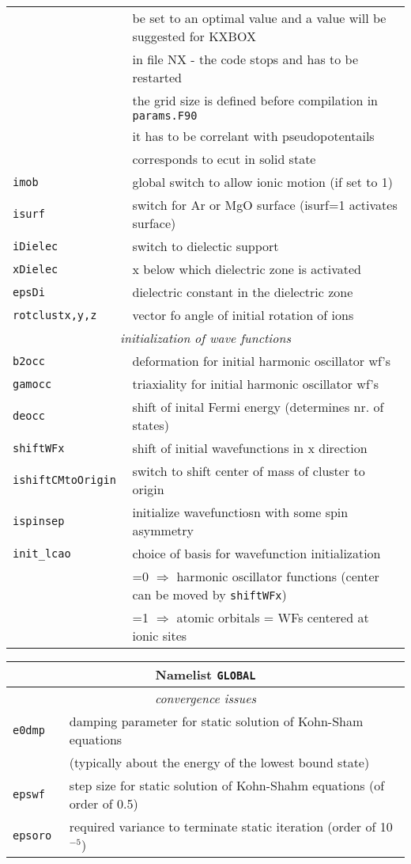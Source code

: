 \documentclass[12pt]{article}
\begin{document}
\begin{tabular}{ll}
&be set to an optimal value and a value will be suggested for KXBOX \\
&in file NX - the code stops and has to be restarted\\
&the grid size is defined before compilation in {\tt params.F90}\\
&it has to be correlant with pseudopotentails\\
&corresponds to ecut in solid state\\
{\tt imob          }& global switch to allow ionic motion (if set to 1) \\
{\tt isurf            }& switch for Ar or MgO surface (isurf=1 activates surface)\\
{\tt iDielec          }& switch to dielectic support\\
{\tt xDielec          }& x below which dielectric zone is activated\\
{\tt epsDi            }& dielectric constant in the dielectric zone\\
{\tt rotclustx,y,z } & vector fo angle of initial rotation of ions\\
\hline
\multicolumn{2}{c}{\it initialization of wave functions} \\
\hline
{\tt b2occ            }& deformation for initial harmonic oscillator wf's\\
{\tt gamocc           }& triaxiality for initial harmonic oscillator wf's\\
{\tt deocc            }& shift of inital Fermi energy (determines nr. of
states)\\
{\tt shiftWFx         }& shift of initial wavefunctions in x direction \\
{\tt ishiftCMtoOrigin }& switch to shift center of mass of cluster to origin\\
{\tt ispinsep         }& initialize wavefunctiosn with some spin asymmetry\\
{\tt init\_lcao       }& choice of basis for wavefunction initialization \\
& =0 $\Longrightarrow$ harmonic oscillator functions (center can be
moved
  by {\tt shiftWFx})
\\
& =1 $\Longrightarrow$ atomic orbitals = WFs centered at ionic sites
\\
\hline
\end{tabular}

\newpage

\begin{tabular}{ll}
\hline
\multicolumn{2}{c}{Namelist {\tt GLOBAL}} in {\tt for005.<name>} \\
\hline
\multicolumn{2}{c}{\it convergence issues} \\
\hline
{\tt e0dmp            }& damping parameter for static solution of Kohn-Sham equations\\
& (typically about the energy of the lowest bound state)\\
{\tt epswf            }& step size for static solution of Kohn-Shahm
equations (of order of 0.5)\\
{\tt epsoro           }& required variance to terminate static iteration (order of 10$^{-5}$)\\
\hline
\end{tabular}
\end{document}
